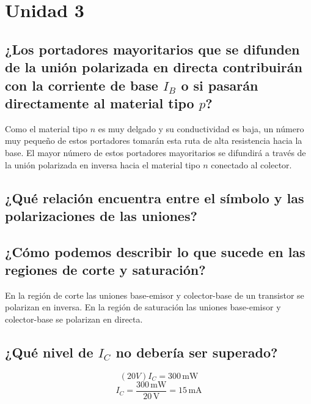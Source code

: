 \section{Unidad 3}

\subsection{¿Los portadores mayoritarios que se difunden de la unión polarizada en directa contribuirán con la corriente de base $I_B$ o si pasarán directamente al material tipo $p$?}

Como el material tipo $n$ es muy delgado y su conductividad es baja, un número muy pequeño de estos portadores tomarán esta ruta de alta resistencia hacia la base. El mayor número de estos portadores mayoritarios se difundirá a través de la unión polarizada en inversa hacia el material tipo $n$ conectado al colector.

\subsection{¿Qué relación encuentra entre el símbolo y las polarizaciones de las uniones?}

\subsection{¿Cómo podemos describir lo que sucede en las regiones de corte y saturación?}

En la región de corte las uniones base-emisor y colector-base de un transistor se polarizan en inversa.  
En la región de saturación las uniones base-emisor y colector-base se polarizan en directa.

\subsection{¿Qué nivel de $I_C$ no debería ser superado?}

\[
    (20V) I_C = 300\,\text{mW}
\]
\[I_C = \dfrac{300\,\text{mW}}{20\,\text{V}} = 15\,\text{mA}
\]
